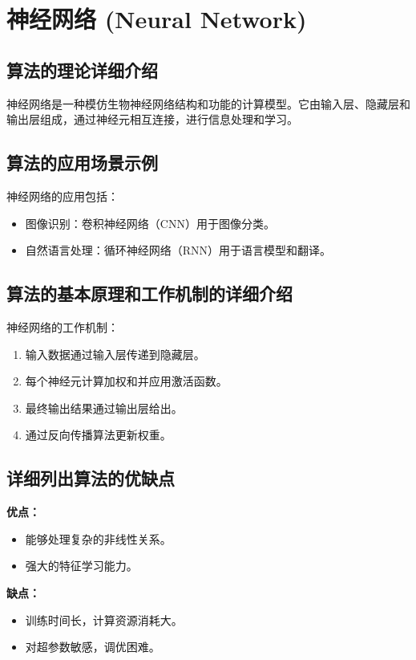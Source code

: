 \section{神经网络 (Neural Network)}
\subsection*{算法的理论详细介绍}
神经网络是一种模仿生物神经网络结构和功能的计算模型。它由输入层、隐藏层和输出层组成，通过神经元相互连接，进行信息处理和学习。

\subsection*{算法的应用场景示例}
神经网络的应用包括：
\begin{itemize}
    \item 图像识别：卷积神经网络（CNN）用于图像分类。
    \item 自然语言处理：循环神经网络（RNN）用于语言模型和翻译。
\end{itemize}

\subsection*{算法的基本原理和工作机制的详细介绍}
神经网络的工作机制：
\begin{enumerate}
    \item 输入数据通过输入层传递到隐藏层。
    \item 每个神经元计算加权和并应用激活函数。
    \item 最终输出结果通过输出层给出。
    \item 通过反向传播算法更新权重。
\end{enumerate}

\subsection*{详细列出算法的优缺点}
\textbf{优点：}
\begin{itemize}
    \item 能够处理复杂的非线性关系。
    \item 强大的特征学习能力。
\end{itemize}

\textbf{缺点：}
\begin{itemize}
    \item 训练时间长，计算资源消耗大。
    \item 对超参数敏感，调优困难。
\end{itemize}

